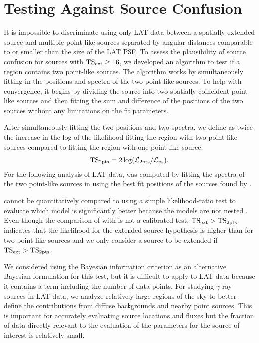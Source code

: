 \section{Testing Against Source Confusion}

It is impossible to discriminate using only LAT data between a
spatially extended source and multiple point-like sources separated by
angular distances comparable to or smaller than the size of the LAT PSF. 
To assess the plausibility of source confusion for sources with
$\mathrm{TS}_\mathrm{ext}\ge16$, we developed an algorithm to test if a region contains
two point-like sources.  The algorithm works by simultaneously fitting
in \pointlike the positions and spectra of the two point-like sources.
To help with convergence, it begins by dividing the source into two
spatially coincident point-like sources and then fitting the sum and
difference of the positions of the two sources without any limitations
on the fit parameters.

After simultaneously fitting the two positions and two spectra,
we define \tsinc as twice the increase in the log of the likelihood
fitting the region with two point-like sources compared to fitting the
region with one point-like source:
\begin{equation}
  \mathrm{TS}_{\mathrm{2pts}}=2\log(\mathcal{L}_\text{2pts}/\mathcal{L}_\text{ps}).
\end{equation} 
For the following analysis of LAT data, \tsinc was computed
by fitting the spectra of the two point-like sources in \gtlike using the best fit positions
of the sources found by \pointlike.

\tsinc cannot be quantitatively compared to \tsext using a simple
likelihood-ratio test to evaluate which model is significantly better
because the models are not nested \citep{protassov_2002a_statistics-handle}.
Even though the comparison of \tsext with \tsinc is not a calibrated
test, $\mathrm{TS}_\mathrm{ext}>\mathrm{TS}_{\mathrm{2pts}}$ indicates that the likelihood for the extended
source hypothesis is higher than for two point-like sources and we only
consider a source to be extended if $\mathrm{TS}_\mathrm{ext}>\mathrm{TS}_{\mathrm{2pts}}$.

We considered using 
the Bayesian information criterion \citep[BIC,][]{schwarz_1978a_estimating-dimension} as
an alternative Bayesian formulation for this test, but it is difficult to apply
to LAT data because it contains a term including the number of data points. 
For studying $\gamma$-ray sources in LAT data, we analyze relatively large
regions of the sky to better define the contributions from diffuse
backgrounds and nearby point sources. This is important for accurately
evaluating source locations and fluxes but the fraction of data directly
relevant to the evaluation of the parameters for the source of interest
is relatively small.

